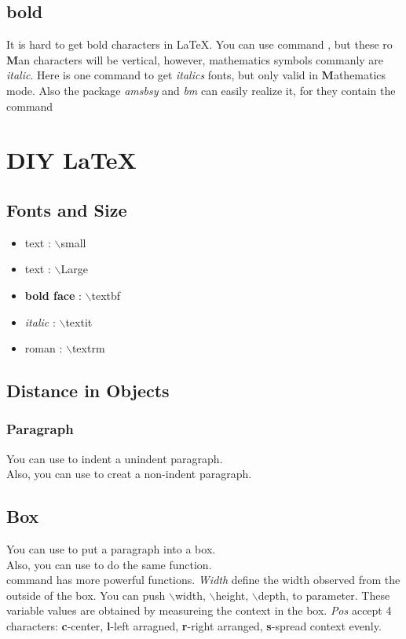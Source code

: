 \documentclass{article}
\begin{document}
\subsection{bold}
It is hard to get bold characters in \LaTeX. You can
use command , but these ro$\mathbf{M}$an characters will be
vertical, however, mathematics symbols commanly are \emph{italic}. Here is one
command 
 to get \emph{italics} fonts, but only valid in $\boldsymbol{M}$athematics mode.
Also the package \emph{amsbsy} and \emph{bm} can easily realize it, for they contain
the command 

\section{DIY \LaTeX}
\subsection{Fonts and Size}
\begin{itemize}
    \item {\small text} : $\backslash$small
    \item {\Large text} : $\backslash$Large
    \item \textbf{bold face} : $\backslash$textbf
    \item \textit{italic} : $\backslash$textit
    \item \textrm{roman} : $\backslash$textrm
\end{itemize}

\subsection{Distance in Objects}
\subsubsection{Paragraph}
You can use  to indent a unindent paragraph. \\
\indent
Also, you can use  to creat a non-indent paragraph.

\subsection{Box}
You can use 
to put a paragraph into a box. \\
\indent
Also, you can use 
to do the same function.\\
\indent
command  has more powerful functions. \emph{Width} define the width observed from the
outside of the box. You can push $\backslash$width, $\backslash$height,
$\backslash$depth, to parameter. These variable values are obtained by measureing the context in the box.
\emph{Pos} accept 4 characters: \textbf{c}-center, \textbf{l}-left arragned, \textbf{r}-right arranged,
\textbf{s}-spread context evenly.
\end{document}
